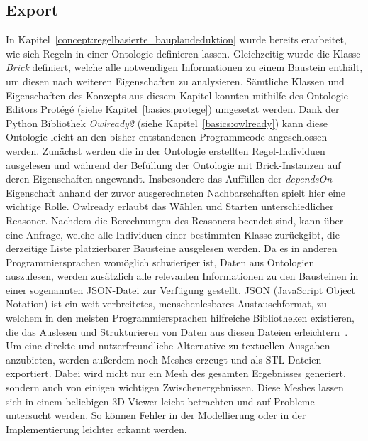 \subsection{Export}\label{real:export}
In Kapitel~\ref{concept:regelbasierte_bauplandeduktion} wurde bereits erarbeitet, wie sich Regeln in einer Ontologie definieren lassen.
Gleichzeitig wurde die Klasse \textit{Brick} definiert, welche alle notwendigen Informationen zu einem Baustein enthält, um diesen nach weiteren Eigenschaften zu analysieren.
Sämtliche Klassen und Eigenschaften des Konzepts aus diesem Kapitel konnten mithilfe des Ontologie-Editors Protégé (siehe Kapitel~\ref{basics:protege}) umgesetzt werden.
Dank der Python Bibliothek \textit{Owlready2} (siehe Kapitel~\ref{basics:owlready}) kann diese Ontologie leicht an den bisher entstandenen Programmcode angeschlossen werden.
Zunächst werden die in der Ontologie erstellten Regel-Individuen ausgelesen und während der Befüllung der Ontologie mit Brick-Instanzen auf deren Eigenschaften angewandt.
Insbesondere das Auffüllen der \textit{dependsOn}-Eigenschaft anhand der zuvor ausgerechneten Nachbarschaften spielt hier eine wichtige Rolle.
Owlready erlaubt das Wählen und Starten unterschiedlicher Reasoner.
Nachdem die Berechnungen des Reasoners beendet sind, kann über eine Anfrage, welche alle Individuen einer bestimmten Klasse zurückgibt, die derzeitige Liste platzierbarer Bausteine ausgelesen werden.
Da es in anderen Programmiersprachen womöglich schwieriger ist, Daten aus Ontologien auszulesen, werden zusätzlich alle relevanten Informationen zu den Bausteinen in einer sogenannten JSON-Datei zur Verfügung gestellt.
JSON (JavaScript Object Notation) ist ein weit verbreitetes, menschenlesbares Austauschformat, zu welchem in den meisten Programmiersprachen hilfreiche Bibliotheken existieren, die das Auslesen und Strukturieren von Daten aus diesen Dateien erleichtern~\cite{json}.
Um eine direkte und nutzerfreundliche Alternative zu textuellen Ausgaben anzubieten, werden außerdem noch Meshes erzeugt und als STL-Dateien exportiert.
Dabei wird nicht nur ein Mesh des gesamten Ergebnisses generiert, sondern auch von einigen wichtigen Zwischenergebnissen.
Diese Meshes lassen sich in einem beliebigen 3D Viewer leicht betrachten und auf Probleme untersucht werden.
So können Fehler in der Modellierung oder in der Implementierung leichter erkannt werden.